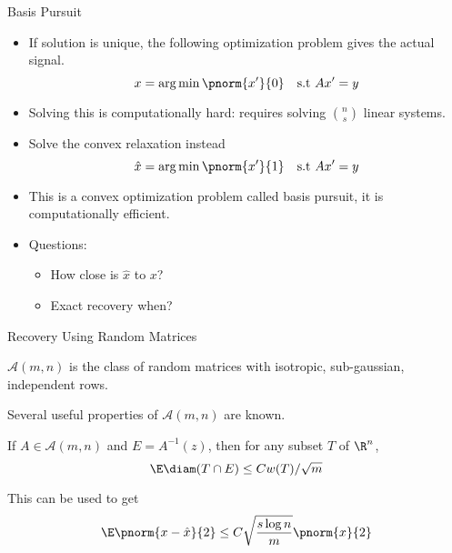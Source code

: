 \documentclass{beamer}
\begin{document}
\begin{frame}{Basis Pursuit}
	\begin{itemize}
		\item If solution is unique, the following optimization problem
			gives the actual signal.
			\[
				x = \arg\min\pnorm{x'}{0}\quad \text{s.t } Ax' = y
			\]
			
			\pause

		\item Solving this is computationally hard: requires
			solving $\binom{n}{s}$ linear systems.

			\pause

		\item Solve the convex relaxation instead
			\[
				\hat{x} = \arg\min\pnorm{x'}{1}\quad \text{s.t } Ax' = y
			\]

			\pause

		\item This is a convex optimization problem called
			basis pursuit, it is computationally
			efficient.

			\pause

		\item Questions:
			\begin{itemize}
				\item How close is $\hat{x}$ to $x$?					
				\item Exact recovery when?
			\end{itemize}
	\end{itemize}
\end{frame}

\begin{frame}{Recovery Using Random Matrices}
	\begin{definition}
		$\mathcal{A}(m, n)$ is the class of random matrices with
		isotropic, sub-gaussian, independent rows.
	\end{definition}
	
	\pause
	Several useful properties of $\mathcal{A}(m, n)$ are known.
	
	\pause

	\begin{theorem}
		If $A\in\mathcal{A}(m, n)$ and $E = A^{-1}(z)$,
		then for any subset $T$ of $\R^n$,
		\[
			\E\diam(T\cap E)\leq Cw(T)/\sqrt{m}
		\]
	\end{theorem}

	\pause

		 This can be used to get
			\[
				\E\pnorm{x - \hat{x}}{2}\leq C\sqrt{\frac{{s\log n}}
				{{m}}}\pnorm{x}{2}
			\]
			

\end{frame}
\end{document}

